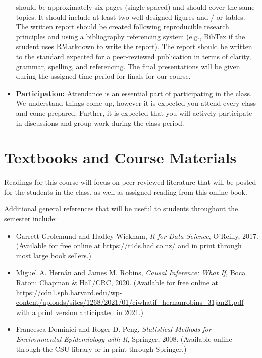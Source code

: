 \documentclass[
]{book}
\providecommand{\tightlist}{%
  \setlength{\itemsep}{0pt}\setlength{\parskip}{0pt}}
\begin{document}
\begin{itemize}
  should be approximately six pages (single spaced) and should cover the
  same topics. It should include at least two well-designed figures and / or
  tables. The written report should be created following reproducible
  research principles and using a bibliography referencing system (e.g.,
  BibTex if the student uses RMarkdown to write the report). The report
  should be written to the standard expected for a peer-reviewed
  publication in terms of clarity, grammar, spelling, and referencing.
  The final presentations will be given during the assigned time period
  for finals for our course.
\item
  \textbf{Participation:} Attendance is an essential part of participating
  in the class. We understand things come up, however it is expected you
  attend every class and come prepared. Further, it is expected that you will
  actively participate in discussions and group work during the class period.
\end{itemize}

\hypertarget{textbooks-and-course-materials}{%
\section{Textbooks and Course Materials}\label{textbooks-and-course-materials}}

Readings for this course will focus on peer-reviewed literature that will be
posted for the students in the class, as well as assigned reading from this
online book.

Additional general references that will be useful
to students throughout the semester include:

\begin{itemize}
\tightlist
\item
  Garrett Grolemund and Hadley Wickham, \emph{R for Data Science}, O'Reilly, 2017. (Available for free online at \url{https://r4ds.had.co.nz/} and in print through
  most large book sellers.)
\item
  Miguel A. Hernán and James M. Robins, \emph{Causal Inference: What If}, Boca Raton: Chapman \& Hall/CRC, 2020. (Available for free online at \url{https://cdn1.sph.harvard.edu/wp-content/uploads/sites/1268/2021/01/ciwhatif_hernanrobins_31jan21.pdf} with a print version anticipated in 2021.)
\item
  Francesca Dominici and Roger D. Peng, \emph{Statistical Methods for Environmental Epidemiology with R}, Springer, 2008. (Available online through the CSU library or in print through Springer.)
\end{itemize}
\end{document}
